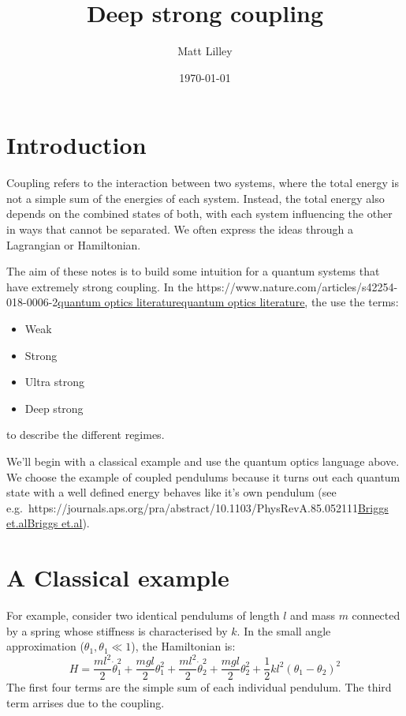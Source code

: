 \documentclass[
]{article}
\title{Deep strong coupling}
\author{Matt Lilley}
\date{\today}  %
\let\oldhref\href
\renewcommand{\href}[2]{\ifx#1\urlprefix\oldhref{#1}{#2}\else\uline{\oldhref{#1}{#2}}\fi}
\renewcommand{\[}{\begin{equation}}
\renewcommand{\]}{\end{equation}}
\providecommand{\tightlist}{%
  \setlength{\itemsep}{0pt}\setlength{\parskip}{0pt}}
\begin{document}
\maketitle

\section{Introduction}\label{introduction}

Coupling refers to the interaction between two systems, where the total
energy is not a simple sum of the energies of each system. Instead, the
total energy also depends on the combined states of both, with each
system influencing the other in ways that cannot be separated. We often
express the ideas through a Lagrangian or Hamiltonian.

The aim of these notes is to build some intuition for a quantum systems
that have extremely strong coupling. In the
\href{https://www.nature.com/articles/s42254-018-0006-2}{quantum optics
literature}, the use the terms:

\begin{itemize}
\tightlist
\item
  Weak
\item
  Strong
\item
  Ultra strong
\item
  Deep strong
\end{itemize}

to describe the different regimes.

We'll begin with a classical example and use the quantum optics language
above. We choose the example of coupled pendulums because it turns out
each quantum state with a well defined energy behaves like it's own
pendulum (see
e.g.~\href{https://journals.aps.org/pra/abstract/10.1103/PhysRevA.85.052111}{Briggs
et.al}).

\section{A Classical example}\label{a-classical-example}

For example, consider two identical pendulums of length \(l\) and mass
\(m\) connected by a spring whose stiffness is characterised by \(k\).
In the small angle approximation (\(\theta_1, \theta_1 \ll 1\)), the
Hamiltonian is: \[
H = \frac{m l^2}{2} \dot{\theta}_1^2 + \frac{m g l}{2} \theta_1^2 + \frac{m l^2}{2} \dot{\theta}_2^2 + \frac{m g l}{2} \theta_2^2 + \frac{1}{2} k l^2(\theta_1 - \theta_2)^2
\] The first four terms are the simple sum of each individual pendulum.
The third term arrises due to the coupling.
\end{document}
